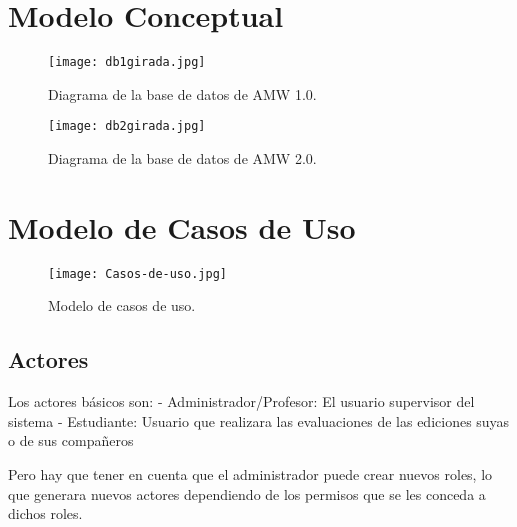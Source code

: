 


\section{Modelo Conceptual}

\begin{figure}
	\centering
	\texttt{[image: db1girada.jpg]}
	\caption{Diagrama de la base de datos de AMW 1.0.}
\end{figure}

\begin{figure}
	\centering
	\texttt{[image: db2girada.jpg]}
	\caption{Diagrama de la base de datos de AMW 2.0.}
\end{figure}

\newpage

\section{Modelo de Casos de Uso}

\begin{figure}
	\centering
	\texttt{[image: Casos-de-uso.jpg]}
	\caption{Modelo de casos de uso.}
\end{figure}

\subsection{Actores} 
Los actores básicos son:
\newline
- Administrador/Profesor: El usuario supervisor del sistema
\newline
- Estudiante: Usuario que realizara las evaluaciones de las ediciones suyas o de sus compañeros
\newline

Pero hay que tener en cuenta que el administrador puede crear nuevos roles, lo que generara nuevos actores dependiendo de los permisos que se les conceda a dichos roles.

\newpage


